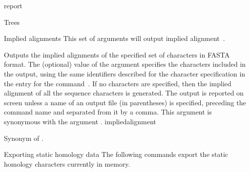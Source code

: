 \begin{command}{report}{}
\begin{arguments}
\begin{argumentgroup}{Trees}
		\end{argumentgroup}

		\begin{argumentgroup}{Implied alignments}
            {This set of arguments will output implied alignment~\cite{wheeler2003}.} 

                {Outputs the implied alignments of the specified
                set of characters in FASTA format. The (optional) value of the
                argument specifies the characters included
                in the output, using the same identifiers described for the
                character specification in the entry for the command~. If no
                characters are specified, then the implied alignment of all the
                sequence characters is generated. The output is reported on
                screen unless a name of an output file (in parentheses) is
                specified, preceding the command name and separated from it by a
                comma. This argument is synonymous with the argument
                .}
                {impliedalignment}

                {Synonym of .}
                {}

        \end{argumentgroup}

        \begin{argumentgroup}{Exporting static homology data}
            {The following commands export the static homology characters
            currently in memory.}


\end{argumentgroup}
\end{arguments}
\end{command}
